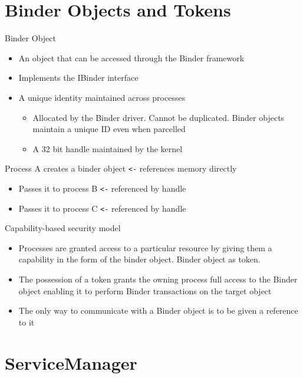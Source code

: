 \documentclass{article}
\begin{document}
\section{Binder Objects and Tokens}
\begin{flushleft}
Binder	Object
\begin{itemize}
  \item An object that can be accessed through the Binder framework
  \item Implements the IBinder interface 
  \item A unique identity maintained across processes
  \begin{itemize}
    \item Allocated by the Binder driver. Cannot be duplicated. Binder objects maintain a unique ID even when parcelled 
    \item A 32 bit handle maintained by the kernel
  \end{itemize}
\end{itemize}
Process A creates a binder object \verb|<-| references memory directly
\begin{itemize}
  \item Passes it to process B \verb|<-| referenced by handle
  \item Passes it to process C \verb|<-| referenced by handle
\end{itemize}
Capability-based security model
\begin{itemize}
  \item Processes are granted access to a particular resource by giving them a capability in the form of the binder object. Binder object as token.
  \item The possession of a token grants the owning process full access to the Binder object enabling it to perform Binder transactions on the target object 
  \item The only way to communicate with a Binder object is to be given a reference to it
\end{itemize}
\end{flushleft}

\section{ServiceManager}
\end{document}
